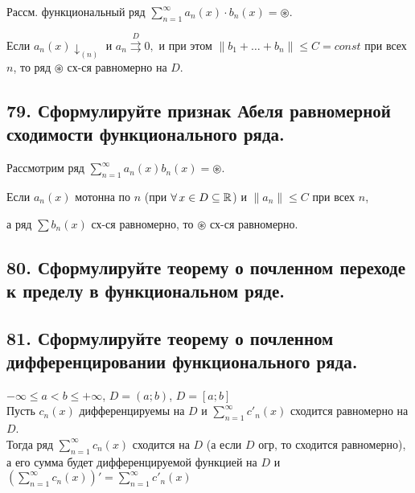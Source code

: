 \documentclass[a4paper, fleqn]{article}
\begin{document}
    Рассм. функциональный ряд $\displaystyle \sum_{n = 1}^{\infty} a_n(x) \cdot b_n(x) = \circledast.$
    
    Если $a_n(x) \downarrow_{(n)}$ и $a_n\stackrel{D}{\rightrightarrows} 0, $  и при этом $\| b_1 + \dots + b_n\| \leq C = const $ при всех $n$, то ряд $\circledast$ сх-ся равномерно на $D$.
    
        
    
    \subsection*{79. Сформулируйте признак Абеля равномерной сходимости функционального ряда.}
        
        Рассмотрим ряд $\displaystyle \sum_{n = 1}^{\infty} a_n(x) b_n(x) = \circledast$.
        
        Если $a_n(x)$ мотонна по $n$ (при $\forall \, x \in D \subseteq \mathbb{R}$) и $ \| a_n \| \leq C$ при всех $n$,
        
        а ряд $\sum b_n(x)$ сх-ся равномерно, то $\circledast$ сх-ся равномерно.
        
    \subsection*{80. Сформулируйте теорему о почленном переходе
     к пределу в функциональном ряде.}
    \subsection*{81. Сформулируйте теорему о почленном дифференцировании функционального ряда.}
    $-\infty \leq a < b \leq +\infty$, $D= (a; b)$, $D = [a; b]$ \\
    Пусть $c_n(x)$ дифференцируемы на $D$ и $\sum_{n=1}^{\infty} c'_n(x)$ сходится равномерно на $D$. \\
    Тогда ряд $\sum_{n=1}^{\infty} c_n(x)$ сходится на $D$ (а если $D$ огр, то сходится равномерно), а его сумма будет дифференцируемой функцией на $D$ и $\left(\sum_{n=1}^{\infty} c_n(x)\right)' = \sum_{n=1}^{\infty} c'_n(x)$ \\
        
\end{document}
